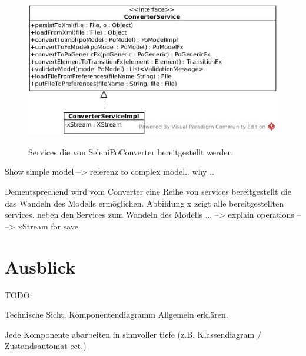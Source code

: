 \begin{figure}[htb]
  \centering  
  \includegraphics[scale=0.5]{img/ConverterService.jpg}\\
  \caption{Services die von SeleniPoConverter bereitgestellt werden}
  \label{fig:simple_model}
\end{figure}


Show simple model
--> referenz to complex model.. why ..

Dementsprechend wird vom Converter eine Reihe von services bereitgestellt die das Wandeln des Modells ermöglichen. Abbildung x zeigt alle bereitgestellten services. neben den Services zum Wandeln des Modells ...
--> explain operations
-- --> xStream for save

\section{Ausblick}

TODO: 

Technische Sicht. 
Komponentendiagramm Allgemein erklären.

Jede Komponente abarbeiten in sinnvoller tiefe (z.B. Klassendiagram / Zustandsautomat ect.)













